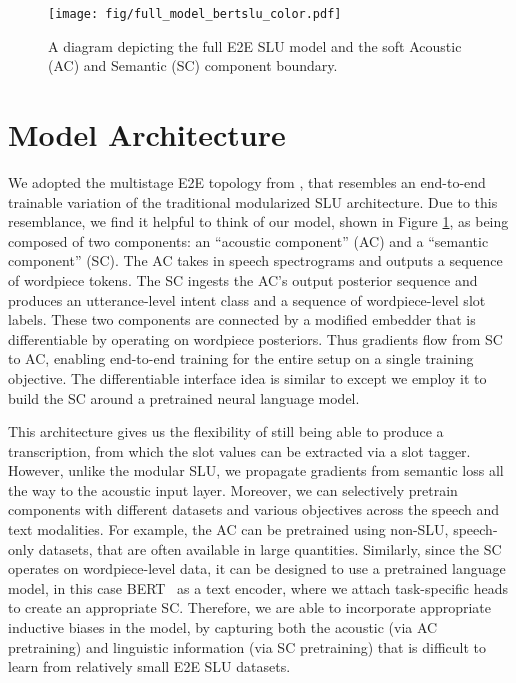 
\begin{figure}[t!]
	\centering
	\texttt{[image: fig/full\_model\_bertslu\_color.pdf]}
	\caption{A diagram depicting the full E2E SLU model and the soft  Acoustic (AC) and Semantic (SC) component boundary.}
	\label{fig:model}
	\vspace{-12pt}
\end{figure}

\section{Model Architecture}
\label{sec:model}

We adopted the multistage E2E topology from \cite{haghani2018audio}, that resembles an end-to-end trainable variation of the traditional modularized SLU architecture. Due to this resemblance, we find it helpful to think of our model, shown in Figure \ref{fig:model}, as being composed of two components: an ``acoustic component'' (AC) and a ``semantic component'' (SC). The AC takes in speech spectrograms and outputs a sequence of wordpiece tokens. The SC ingests the AC's output posterior sequence and produces an utterance-level intent class and a sequence of wordpiece-level slot labels. These two components are connected by a modified embedder that is differentiable by operating on wordpiece posteriors. Thus gradients flow from SC to AC, enabling end-to-end training for the entire setup on a single training objective. The differentiable interface idea is similar to \cite{Rao_2020} except we employ it to build the SC around a pretrained neural language model. 

This architecture gives us the flexibility of still being able to produce a transcription, from which the slot values can be extracted via a slot tagger. However, unlike the modular SLU, we propagate gradients from semantic loss all the way to the acoustic input layer. Moreover, we can selectively pretrain components with different datasets and various objectives across the speech and text modalities. For example, the AC can be pretrained using non-SLU, speech-only datasets, that are often available in large quantities. Similarly, since the SC operates on wordpiece-level data, it can be designed to use a pretrained language model, in this case BERT~\cite{devlin2018bert} as a text encoder, where we attach task-specific heads to create an appropriate SC. Therefore, we are able to incorporate appropriate inductive biases in the model, by capturing both the acoustic (via AC pretraining) and linguistic information (via SC pretraining) that is difficult to learn from relatively small E2E SLU datasets.

